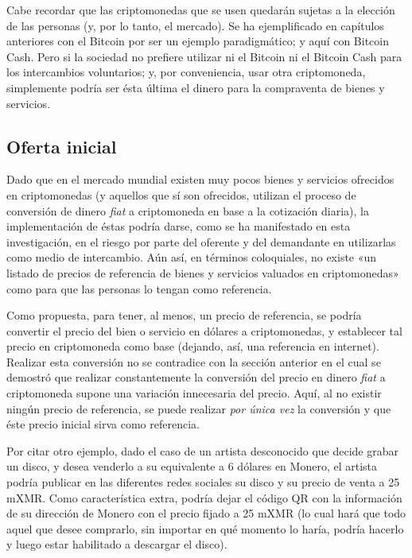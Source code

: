 \documentclass[12pt,a4paper,twoside]{book}
\begin{document}
Cabe recordar que las criptomonedas que se usen quedarán sujetas a la elección de las personas (y, por lo tanto, el mercado). Se ha ejemplificado en capítulos anteriores con el Bitcoin por ser un ejemplo paradigmático; y aquí con Bitcoin Cash. Pero si la sociedad no prefiere utilizar ni el Bitcoin ni el Bitcoin Cash para los intercambios voluntarios; y, por conveniencia, usar otra criptomoneda, simplemente podría ser ésta última el dinero para la compraventa de bienes y servicios.

\subsection{Oferta inicial}
Dado que en el mercado mundial existen muy pocos bienes y servicios ofrecidos en criptomonedas (y aquellos que sí son ofrecidos, utilizan el proceso de conversión de dinero \textit{fiat} a criptomoneda en base a la cotización diaria), la implementación de éstas podría darse, como se ha manifestado en esta investigación, en el riesgo por parte del oferente y del demandante en utilizarlas como medio de intercambio. Aún así, en términos coloquiales, no existe «un listado de precios de referencia de bienes y servicios valuados en criptomonedas» como para que las personas lo tengan como referencia.

Como propuesta, para tener, al menos, un precio de referencia, se podría convertir el precio del bien o servicio en dólares a criptomonedas, y establecer tal precio en criptomoneda como base (dejando, así, una referencia en internet). Realizar esta conversión no se contradice con la sección anterior en el cual se demostró que realizar constantemente la conversión del precio en dinero \textit{fiat} a criptomoneda supone una variación innecesaria del precio. Aquí, al no existir ningún precio de referencia, se puede realizar \textit{por única vez} la conversión y que éste precio inicial sirva como referencia.

Por citar otro ejemplo, dado el caso de un artista desconocido que decide grabar un disco, y desea venderlo a su equivalente a 6 dólares en Monero, el artista podría publicar en las diferentes redes sociales su disco y su precio de venta a 25 mXMR. Como característica extra, podría dejar el código QR con la información de su dirección de Monero con el precio fijado a 25 mXMR (lo cual hará que todo aquel que desee comprarlo, sin importar en qué momento lo haría, podría hacerlo y luego estar habilitado a descargar el disco).
\end{document}
